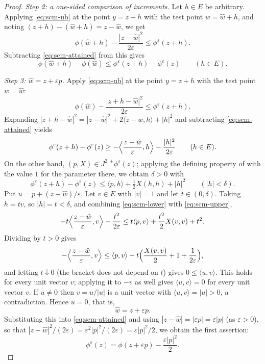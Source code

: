 \begin{proof}
\emph{Step 2: a one-sided comparison of increments.}
Let $h\in E$ be arbitrary. Applying \eqref{eq:scm-ub} at the point $y=z+h$ with
the test point $w=\hat w+h$, and noting
$(z+h)-(\hat w+h)=z-\hat w$, we get
\[
  \phi(\hat w+h)-\frac{|z-\hat w|^2}{2\varepsilon}
   \le\phi^\varepsilon(z+h).
\]
Subtracting \eqref{eq:scm-attained} from this gives
\begin{equation}\label{eq:scm-increment}
  \phi(\hat w+h)-\phi(\hat w)\le\phi^\varepsilon(z+h)-\phi^\varepsilon(z)
  \qquad(h\in E).
\end{equation}

\emph{Step 3: $\hat w=z+\varepsilon p$.}
Apply \eqref{eq:scm-ub} at the point $y=z+h$ with the test point $w=\hat w$:
\[
  \phi(\hat w)-\frac{|z+h-\hat w|^2}{2\varepsilon}\le\phi^\varepsilon(z+h).
\]
Expanding $|z+h-\hat w|^2=|z-\hat w|^2+2\langle z-\hat w,h\rangle+|h|^2$ and
subtracting \eqref{eq:scm-attained} yields
\begin{equation}\label{eq:scm-lower}
  \phi^\varepsilon(z+h)-\phi^\varepsilon(z)
   \ge-\Bigl\langle\frac{z-\hat w}{\varepsilon},h\Bigr\rangle
       -\frac{|h|^2}{2\varepsilon}
  \qquad(h\in E).
\end{equation}
On the other hand, $(p,X)\in J^{2,+}\phi^\varepsilon(z)$; applying the defining
property of  with the value $1$ for the parameter there, we
obtain $\delta>0$ with
\begin{equation}\label{eq:scm-upper}
  \phi^\varepsilon(z+h)-\phi^\varepsilon(z)
   \le\langle p,h\rangle+\tfrac12X(h,h)+|h|^2
  \qquad(|h|<\delta).
\end{equation}
Put $u=p+(z-\hat w)/\varepsilon$. Let $v\in E$ with $|v|=1$ and let
$t\in(0,\delta)$. Taking $h=tv$, so $|h|=t<\delta$, and combining
\eqref{eq:scm-lower} with \eqref{eq:scm-upper},
\[
  -t\Bigl\langle\frac{z-\hat w}{\varepsilon},v\Bigr\rangle-\frac{t^2}{2\varepsilon}
   \le t\langle p,v\rangle+\frac{t^2}{2}X(v,v)+t^2 .
\]
Dividing by $t>0$ gives
\[
  -\Bigl\langle\frac{z-\hat w}{\varepsilon},v\Bigr\rangle
   \le\langle p,v\rangle+t\Bigl(\frac{X(v,v)}{2}+1+\frac{1}{2\varepsilon}\Bigr),
\]
and letting $t\downarrow0$ (the bracket does not depend on $t$) gives
$0\le\langle u,v\rangle$. This holds for every unit vector $v$; applying it to
$-v$ as well gives $\langle u,v\rangle=0$ for every unit vector $v$. If $u\ne0$
then $v=u/|u|$ is a unit vector with $\langle u,v\rangle=|u|>0$, a
contradiction. Hence $u=0$, that is,
\[
  \hat w=z+\varepsilon p .
\]
Substituting this into \eqref{eq:scm-attained} and using
$|z-\hat w|=|\varepsilon p|=\varepsilon|p|$ (as $\varepsilon>0$), so that
$|z-\hat w|^2/(2\varepsilon)=\varepsilon^2|p|^2/(2\varepsilon)=\varepsilon|p|^2/2$,
we obtain the first assertion:
\[
  \phi^\varepsilon(z)=\phi(z+\varepsilon p)-\frac{\varepsilon|p|^2}{2}.
\]


\end{proof}
